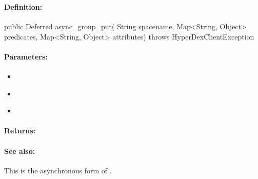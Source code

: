 \pagebreak
\subsubsection{}
\label{api:java:async_group_put}


\paragraph{Definition:}
\begin{javacode}
public Deferred async_group_put(
        String spacename,
        Map<String, Object> predicates,
        Map<String, Object> attributes) throws HyperDexClientException
\end{javacode}

\paragraph{Parameters:}
\begin{itemize}[noitemsep]
\item {}\\

\item {}\\

\item {}\\

\end{itemize}

\paragraph{Returns:}


\paragraph{See also:}  This is the asynchronous form of .

\pagebreak
\subsubsection{}
\label{api:java:put_if_not_exist}


